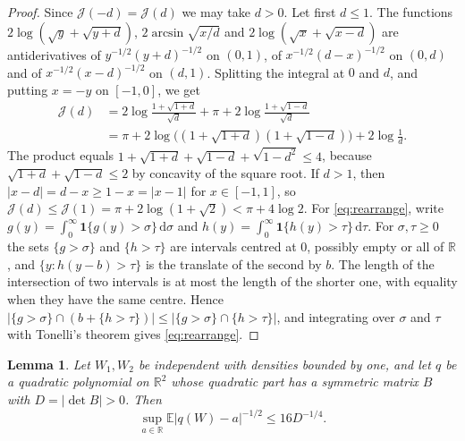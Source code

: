\documentclass[11pt]{amsart}
\numberwithin{equation}{section}
\newtheorem{lemma}[theorem]{Lemma}
\theoremstyle{definition}
\theoremstyle{remark}
\newcommand{\R}{\mathbb R}
\newcommand{\E}{\mathbb E}
\newcommand{\1}{\mathbf 1}
\newcommand{\dd}{\,\mathrm d}
\newcommand{\abs}[1]{\lvert #1\rvert}
\begin{document}
\begin{proof}
Since $\mathcal J(-d)=\mathcal J(d)$ we may take $d>0$. Let first $d\le1$. The functions $2\log(\sqrt y+\sqrt{y+d})$, $2\arcsin\sqrt{x/d}$ and $2\log(\sqrt x+\sqrt{x-d})$ are antiderivatives of $y^{-1/2}(y+d)^{-1/2}$ on $(0,1)$, of $x^{-1/2}(d-x)^{-1/2}$ on $(0,d)$ and of $x^{-1/2}(x-d)^{-1/2}$ on $(d,1)$. Splitting the integral at $0$ and $d$, and putting $x=-y$ on $[-1,0]$, we get
\begin{align*}
\mathcal J(d)&=2\log\frac{1+\sqrt{1+d}}{\sqrt d}+\pi+2\log\frac{1+\sqrt{1-d}}{\sqrt d}\\
&=\pi+2\log\bigl((1+\sqrt{1+d})(1+\sqrt{1-d})\bigr)+2\log\frac1d .
\end{align*}
The product equals $1+\sqrt{1+d}+\sqrt{1-d}+\sqrt{1-d^2}\le4$, because $\sqrt{1+d}+\sqrt{1-d}\le2$ by concavity of the square root. If $d>1$, then $\abs{x-d}=d-x\ge1-x=\abs{x-1}$ for $x\in[-1,1]$, so $\mathcal J(d)\le\mathcal J(1)=\pi+2\log(1+\sqrt2)<\pi+4\log2$. For \eqref{eq:rearrange}, write $g(y)=\int_0^\infty\1\{g(y)>\sigma\}\dd\sigma$ and $h(y)=\int_0^\infty\1\{h(y)>\tau\}\dd\tau$. For $\sigma,\tau\ge0$ the sets $\{g>\sigma\}$ and $\{h>\tau\}$ are intervals centred at $0$, possibly empty or all of $\R$, and $\{y:h(y-b)>\tau\}$ is the translate of the second by $b$. The length of the intersection of two intervals is at most the length of the shorter one, with equality when they have the same centre. Hence $\abs{\{g>\sigma\}\cap(b+\{h>\tau\})}\le\abs{\{g>\sigma\}\cap\{h>\tau\}}$, and integrating over $\sigma$ and $\tau$ with Tonelli's theorem gives \eqref{eq:rearrange}.
\end{proof}

\begin{lemma}\label{lem:pairhalf}
Let $W_1,W_2$ be independent with densities bounded by one, and let $q$ be a quadratic polynomial on $\R^2$ whose quadratic part has a symmetric matrix $B$ with $D=\abs{\det B}>0$. Then
\[
\sup_{a\in\R}\E\abs{q(W)-a}^{-1/2}\le16D^{-1/4}.
\]
\end{lemma}
\end{document}
